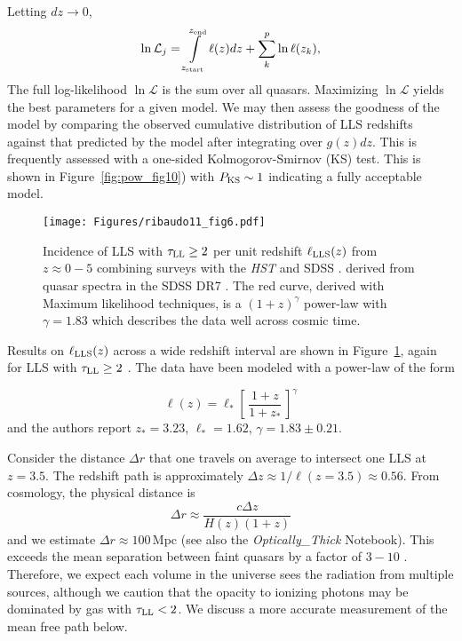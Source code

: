 \documentclass[graybox]{svmult}
\def\ltk{\left [ \,}
\def\rtk{\, \right  ] }
\def\smm{\sum\limits}
\def\intl{\int\limits}
\begin{document}
Letting $dz \to 0$,
\begin{equation}
\ln \mathcal{L}_j = \intl_{z_{\rm start}}^{z_{\rm end}} \ell(z) dz
+ \smm_{k}^p \ln \ell(z_k),
\end{equation}
The full log-likelihood $\ln \mathcal{L}$ is the sum over all quasars.
Maximizing $\ln \mathcal{L}$ yields
the best parameters for a given model.
We may then assess the goodness of the model by comparing
the observed cumulative distribution of LLS redshifts
against that predicted by the model after integrating over $g(z)dz$. 
This is frequently assessed with a one-sided 
Kolmogorov-Smirnov (KS) test.
This is shown in  Figure~\ref{fig:pow_fig10}) with
$P_{\rm KS} \sim 1$ indicating a fully acceptable model.

%
\begin{figure}[b]
\sidecaption
\texttt{[image: Figures/ribaudo11\_fig6.pdf]}
%
%
\caption{Incidence of LLS with $\tau_{\rm LL} \ge 2$
per unit redshift $\ell_{\rm LLS}(z)$ from $z\approx 0-5$
combining surveys with the {\it HST} and SDSS
\cite[]{ribaudo11}.
derived from quasar spectra in the SDSS DR7 \cite{pow10}.
The red curve, derived with Maximum likelihood techniques,
is a $(1+z)^\gamma$ power-law with $\gamma = 1.83$ which
describes the data well across cosmic time.
}
\label{fig:rib11_fig6}       %
\end{figure}


Results on $\ell_{\rm LLS}(z)$ across a wide redshift interval
are shown in Figure~\ref{fig:rib11_fig6}, again for
LLS with $\tau_{\rm LL} \ge 2$ \cite[]{ribaudo11}.
The data have been modeled with a 
power-law of the form

  	\begin{equation}
  	\ell(z) = \ell_* \ltk \frac{1+z}{1+z_*} \rtk^\gamma
  	\label{eqn:lz}
  	\end{equation}
and the authors report
$z_* = 3.23$, $\ell_* = 1.62$, $\gamma = 1.83 \pm 0.21$.

Consider the distance $\Delta r$ that one travels
on average to intersect one LLS at $z=3.5$.
The redshift path is approximately
$\Delta z \approx 1 / \ell(z=3.5) \approx 0.56$.
From cosmology,  the physical distance is
\begin{equation}
\Delta r \approx \frac{c \Delta z}{H(z) (1+z)}
\end{equation}
and we estimate $\Delta r \approx 100$\,Mpc
(see also the {\it Optically\_Thick} Notebook).
This exceeds the mean separation between faint
quasars by a factor of $3-10$ \cite{flz+09}.
Therefore, we expect each volume in the universe sees
the radiation from multiple sources, although we caution
that the opacity to ionizing photons may be dominated
by gas with $\tau_{\rm LL} <2$.  We discuss a more 
accurate measurement of the mean free path below.
\end{document}
